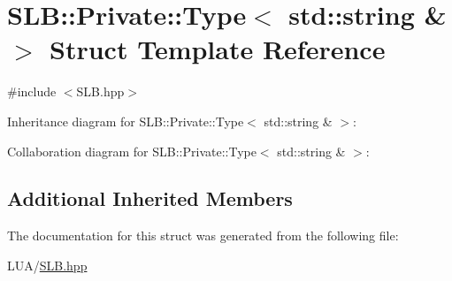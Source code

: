 \hypertarget{structSLB_1_1Private_1_1Type_3_01std_1_1string_01_6_01_4}{}\section{S\+LB\+:\+:Private\+:\+:Type$<$ std\+:\+:string \& $>$ Struct Template Reference}
\label{structSLB_1_1Private_1_1Type_3_01std_1_1string_01_6_01_4}


{\ttfamily \#include $<$S\+L\+B.\+hpp$>$}



Inheritance diagram for S\+LB\+:\+:Private\+:\+:Type$<$ std\+:\+:string \& $>$\+:


Collaboration diagram for S\+LB\+:\+:Private\+:\+:Type$<$ std\+:\+:string \& $>$\+:
\subsection*{Additional Inherited Members}


The documentation for this struct was generated from the following file\+:\begin{DoxyCompactItemize}
\item 
L\+U\+A/\hyperlink{SLB_8hpp}{S\+L\+B.\+hpp}\end{DoxyCompactItemize}
